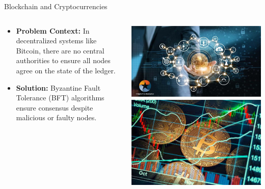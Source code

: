 \documentclass{beamer}
\begin{document}
\begin{frame}{Blockchain and Cryptocurrencies}
    \begin{columns}
        \begin{column}{0.6\textwidth}
            \begin{itemize}
                \item \textbf{Problem Context:} In decentralized systems like Bitcoin, there are no central authorities to ensure all nodes agree on the state of the ledger.\pause
                \item \textbf{Solution:} Byzantine Fault Tolerance (BFT) algorithms ensure consensus despite malicious or faulty nodes.
            \end{itemize}
        \end{column}

        \begin{column}{0.5\textwidth}
            \centering
            \includegraphics[width=1\textwidth]{image3/block-chain-digitalisation.jpg}\\[0.5cm]
            \includegraphics[width=1\textwidth]{image3/crypto.jpg}
        \end{column}
    \end{columns}
\end{frame}
\end{document}
